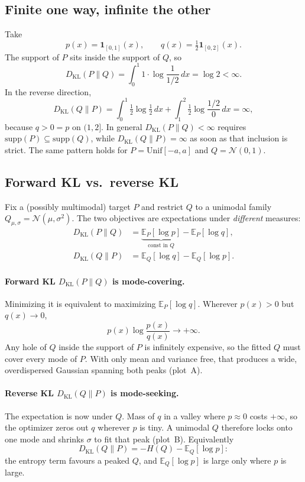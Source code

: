 \documentclass[11pt]{article}
\newcommand{\KL}{D_{\mathrm{KL}}}
\newcommand{\E}{\mathbb{E}}
\newcommand{\ind}{\mathbf{1}}
\begin{document}
\subsection{Finite one way, infinite the other}

Take
\[
  p(x)=\ind_{[0,1]}(x),\qquad
  q(x)=\tfrac12\ind_{[0,2]}(x).
\]
The support of \(P\) sits inside the support of \(Q\), so
\[
  \KL(P\|Q)
  =\int_0^1 1\cdot\log\frac{1}{1/2}\,dx
  =\log 2<\infty.
\]
In the reverse direction,
\[
  \KL(Q\|P)
  =\int_0^1 \tfrac12\log\tfrac12\,dx
  +\int_1^2 \tfrac12\log\frac{1/2}{0}\,dx
  =\infty,
\]
because \(q>0=p\) on \((1,2]\). In general \(\KL(P\|Q)<\infty\) requires
\(\mathrm{supp}(P)\subseteq\mathrm{supp}(Q)\), while
\(\KL(Q\|P)=\infty\) as soon as that inclusion is strict. The same
pattern holds for \(P=\mathrm{Unif}[-a,a]\) and \(Q=\mathcal{N}(0,1)\).

\subsection{Forward KL vs.\ reverse KL}

Fix a (possibly multimodal) target \(P\) and restrict \(Q\) to a
unimodal family \(Q_{\mu,\sigma}=\mathcal{N}(\mu,\sigma^2)\). The two
objectives are expectations under \emph{different} measures:
\begin{align}
  \KL(P\|Q)
  &=\underbrace{\E_P[\log p]}_{\text{const in \(Q\)}
  }-\E_P[\log q],\\
  \KL(Q\|P)
  &=\E_Q[\log q]-\E_Q[\log p].
\end{align}

\paragraph{Forward KL \(\KL(P\|Q)\) is mode-covering.}
Minimizing it is equivalent to maximizing \(\E_P[\log q]\). Wherever
\(p(x)>0\) but \(q(x)\to 0\),
\[
  p(x)\log\frac{p(x)}{q(x)}\longrightarrow +\infty.
\]
Any hole of \(Q\) inside the support of \(P\) is infinitely expensive,
so the fitted \(Q\) must cover every mode of \(P\). With only mean and
variance free, that produces a wide, overdispersed Gaussian spanning
both peaks (plot~A).

\paragraph{Reverse KL \(\KL(Q\|P)\) is mode-seeking.}
The expectation is now under \(Q\). Mass of \(q\) in a valley where
\(p\approx 0\) costs \(+\infty\), so the optimizer zeros out \(q\)
wherever \(p\) is tiny. A unimodal \(Q\) therefore locks onto one mode
and shrinks \(\sigma\) to fit that peak (plot~B). Equivalently
\[
  \KL(Q\|P)=-H(Q)-\E_Q[\log p]:
\]
the entropy term favours a peaked \(Q\), and \(\E_Q[\log p]\) is large
only where \(p\) is large.
\end{document}
